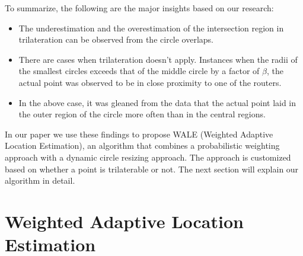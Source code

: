 \documentclass[twocolumn, 11pt]{IEEEtran}
\begin{document}

To summarize, the following are the major insights based on our research:
\begin{itemize}
    \item The underestimation and the overestimation of the intersection region in trilateration can be observed from the circle overlaps.
    \item There are cases when trilateration doesn't apply. Instances when the radii of the smallest circles exceeds that of the middle circle by a factor of \(\beta\), the actual point was observed to be in close proximity to one of the routers. 
    \item In the above case, it was gleaned from the data that the actual point laid in the outer region of the circle more often than in the central regions. 
\end{itemize}



In our paper we use these findings to propose WALE (Weighted Adaptive Location Estimation), an algorithm that combines a probabilistic weighting approach with a dynamic circle resizing approach. The approach is customized based on whether a point is trilaterable or not. The next section will explain our algorithm in detail. 


\section{Weighted Adaptive Location Estimation }
\end{document}
